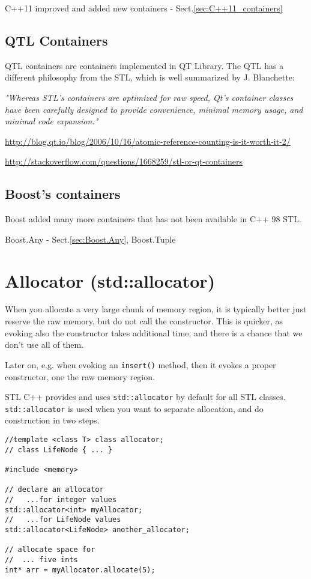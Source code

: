 C++11 improved and added new containers - Sect.\ref{sec:C++11_containers}


\subsection{QTL Containers}
\label{sec:QTL_containers}

QTL containers are containers implemented in QT Library.
The QTL has a different philosophy from the STL, which is well summarized by J.
Blanchette: 

{\it "Whereas STL's containers are optimized for raw speed, Qt's
container classes have been carefully designed to provide convenience, minimal
memory usage, and minimal code expansion."}
 
\url{http://blog.qt.io/blog/2006/10/16/atomic-reference-counting-is-it-worth-it-2/}

\url{http://stackoverflow.com/questions/1668259/stl-or-qt-containers}

\subsection{Boost's containers}
\label{sec:Boost-containers}

Boost added many more containers that has not been available in C++ 98 STL.

Boost.Any - Sect.\ref{sec:Boost.Any}, Boost.Tuple




\section{Allocator (std::allocator)}
\label{sec:Allocator}
\label{sec:std::allocator}

When you allocate a very large chunk of memory region, it is typically better
just reserve the raw memory, but do not call the constructor. This is quicker,
as evoking also the constructor takes additional time, and there is a chance
that we don't use all of them.

Later on, e.g. when evoking an \verb!insert()! method, then it evokes a proper
constructor, one the raw memory region.

STL C++ provides and uses \verb!std::allocator! by default for all STL classes.
\verb!std::allocator! is used when you want to separate allocation,  and do
construction in two steps.

\begin{verbatim}
//template <class T> class allocator;
// class LifeNode { ... }

#include <memory>

// declare an allocator 
//   ...for integer values 
std::allocator<int> myAllocator; 
//   ...for LifeNode values
std::allocator<LifeNode> another_allocator; 

// allocate space for 
//  ... five ints 
int* arr = myAllocator.allocate(5); 
    
\end{verbatim}

